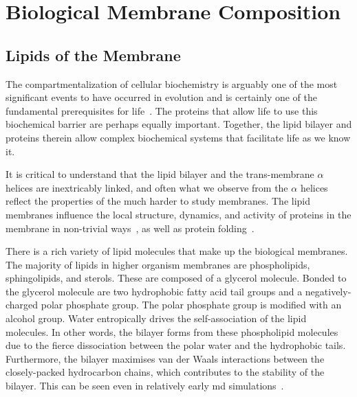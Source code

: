 \section{Biological Membrane Composition}

\subsection{Lipids of the Membrane}

The compartmentalization of cellular biochemistry is arguably one of the most significant events to have occurred in evolution and is certainly one of the fundamental prerequisites for life~\cite{Koshland2002}.  The proteins that allow life to use this biochemical barrier are perhaps equally important. Together, the lipid bilayer and proteins therein allow complex biochemical systems that facilitate life as we know it.

It is critical to understand that the lipid bilayer and the trans-membrane $\alpha$ helices are inextricably linked, and often what we observe from the $\alpha$ helices reflect the properties of the much harder to study membranes. The lipid membranes influence the local structure, dynamics, and activity of proteins in the membrane in non-trivial ways~\cite{Bondar2010, Bondar2009, Jardon-Valadez2010, Kalvodova2005, Urban2005, White2001, Jensen2004, Henin2014}, as well as protein folding~\cite{Kauko2010}. %

There is a rich variety of lipid molecules that make up the biological membranes. The majority of lipids in higher organism membranes are phospholipids, sphingolipids, and sterols. These are composed of a glycerol molecule. Bonded to the glycerol molecule are two hydrophobic fatty acid tail groups and a negatively-charged polar phosphate group. The polar phosphate group is modified with an alcohol group. Water entropically drives the self-association of the lipid molecules. In other words, the bilayer forms from these phospholipid molecules due to the fierce dissociation between the polar water and the hydrophobic tails. Furthermore, the bilayer maximises van der Waals interactions between the closely-packed hydrocarbon chains, which contributes to the stability of the bilayer. This can be seen even in relatively early \gls{md} simulations~\cite{Goetz1998}.

